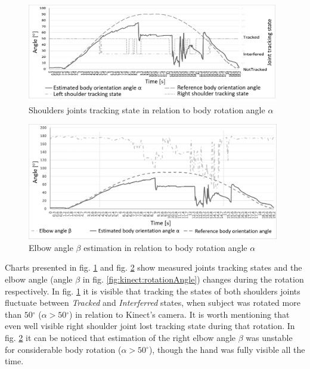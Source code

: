 \documentclass[sensors,article,submit,moreauthors,pdftex,10pt,a4paper]{mdpi}
\newcommand{\degree}{\ensuremath{{}^{\circ}}\xspace}
\begin{document}
\begin{figure}[H] %
	\centering
	\includegraphics[width=11cm]{Figure4.png}
	\caption{Shoulders joints tracking state in relation to body rotation angle $\alpha$}
	\label{fig:kinect:trackingVsAlpha}
\end{figure}
	
\begin{figure}[H] %
	\centering
	\includegraphics[width=11cm]{Figure5.png}
	\caption{Elbow angle $\beta$ estimation in relation to body rotation angle $\alpha$}
	\label{fig:kinect:betaVsAlpha}
\end{figure}
	
Charts presented in fig. \ref{fig:kinect:trackingVsAlpha} and fig. \ref{fig:kinect:betaVsAlpha} show measured joints tracking states and the elbow angle (angle $\beta$ in fig. \ref{fig:kinect:rotationAngle}) changes during the rotation respectively. In fig. \ref{fig:kinect:trackingVsAlpha} it is visible that tracking the states of both shoulders joints fluctuate between \emph{Tracked} and \emph{Interferred} states, when subject was rotated more than $50\degree$ ($\alpha > 50\degree$) in relation to Kinect’s camera. It is worth mentioning that even well visible right shoulder joint lost tracking state during that rotation. In fig. \ref{fig:kinect:betaVsAlpha} it can be noticed that estimation of the right elbow angle $\beta$ was unstable for considerable body rotation ($\alpha > 50\degree$), though the hand was fully visible all the time.
	
\end{document}

